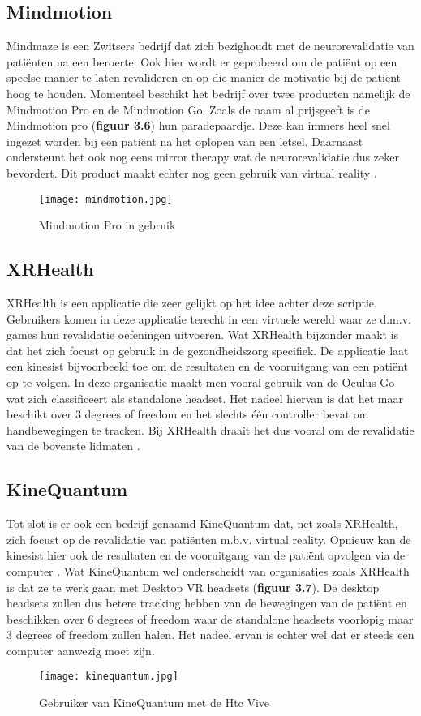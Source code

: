 \subsection{Mindmotion}
Mindmaze is een Zwitsers bedrijf dat zich bezighoudt met de neurorevalidatie van patiënten na een beroerte. Ook hier wordt er geprobeerd om de patiënt op een speelse manier te laten revalideren en op die manier de motivatie bij de patiënt hoog te houden. Momenteel beschikt het bedrijf over twee producten namelijk de Mindmotion Pro en de Mindmotion Go. Zoals de naam al prijsgeeft is de Mindmotion pro (\textbf{figuur 3.6}) hun paradepaardje. Deze kan immers heel snel ingezet worden bij een patiënt na het oplopen van een letsel. Daarnaast ondersteunt het ook nog eens mirror therapy wat de neurorevalidatie dus zeker bevordert. Dit product maakt echter nog geen gebruik van virtual reality \autocite{Mindmotion2019}.

\begin{figure}[h]
    \centering
    \texttt{[image: mindmotion.jpg]}
    \caption{Mindmotion Pro in gebruik \autocite{Mindmotion2019}}
\end{figure}

 \newpage
 
\subsection{XRHealth}
XRHealth is een applicatie die zeer gelijkt op het idee achter deze scriptie. Gebruikers komen in deze applicatie terecht in een virtuele wereld waar ze d.m.v. games hun revalidatie oefeningen uitvoeren. Wat XRHealth bijzonder maakt is dat het zich focust op gebruik in de gezondheidszorg specifiek. De applicatie laat een kinesist bijvoorbeeld toe om de resultaten en de vooruitgang van een patiënt op te volgen. In deze organisatie maakt men vooral gebruik van de Oculus Go wat zich classificeert als standalone headset. Het nadeel hiervan is dat het maar beschikt over 3 degrees of freedom en het slechts één controller bevat om handbewegingen te tracken. Bij XRHealth draait het dus vooral om de revalidatie van de bovenste lidmaten \autocite{XRHealth2019}. 

\subsection{KineQuantum}
Tot slot is er ook een bedrijf genaamd KineQuantum dat, net zoals XRHealth, zich focust op de revalidatie van patiënten m.b.v. virtual reality. Opnieuw kan de kinesist hier ook de resultaten en de vooruitgang van de patiënt opvolgen via de computer \autocite{KineQuantum2019}. Wat KineQuantum wel onderscheidt van organisaties zoals XRHealth is dat ze te werk gaan met Desktop VR headsets (\textbf{figuur 3.7}). De desktop headsets zullen dus betere tracking hebben van de bewegingen van de patiënt en beschikken over 6 degrees of freedom waar de standalone headsets voorlopig maar 3 degrees of freedom zullen halen. Het nadeel ervan is echter wel dat er steeds een computer aanwezig moet zijn. 

\begin{figure}[h]
    \centering
    \texttt{[image: kinequantum.jpg]}
    \caption{Gebruiker van KineQuantum met de Htc Vive \autocite{Bergmann2018}}
\end{figure}
